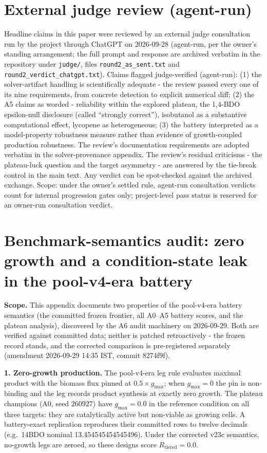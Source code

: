 \documentclass[12pt,a4paper]{article}
\begin{document}
\section{External judge review (agent-run)}
\begin{sloppypar}
Headline claims in this paper were reviewed by an external judge consultation run by the project through ChatGPT on 2026-09-28 (agent-run, per the owner's standing arrangement; the full prompt and response are archived verbatim in the repository under \texttt{judge/}, files \texttt{round2\_as\_sent.txt} and \texttt{round2\_verdict\_chatgpt.txt}). Claims flagged judge-verified (agent-run): (1) the solver-artifact handling is scientifically adequate - the review passed every one of its nine requirements, from concrete detection to explicit numerical diff; (2) the A5 claims as worded - reliability within the explored plateau, the 1,4-BDO epsilon-null disclosure (called ``strongly correct''), isobutanol as a substantive computational effect, lycopene as heterogeneous; (3) the battery interpreted as a model-property robustness measure rather than evidence of growth-coupled production robustness. The review's documentation requirements are adopted verbatim in the solver-provenance appendix. The review's residual criticisms - the plateau-luck question and the target asymmetry - are answered by the tie-break control in the main text. Any verdict can be spot-checked against the archived exchange. Scope: under the owner's settled rule, agent-run consultation verdicts count for internal progression gates only; project-level pass status is reserved for an owner-run consultation verdict.
\end{sloppypar}
\section{Benchmark-semantics audit: zero growth and a condition-state leak in the pool-v4-era battery}
\label{app:semantics}

\textbf{Scope.} This appendix documents two properties of the pool-v4-era battery semantics (the committed frozen frontier, all A0--A5 battery scores, and the plateau analysis), discovered by the A6 audit machinery on 2026-09-29. Both are verified against committed data; neither is patched retroactively - the frozen record stands, and the corrected comparison is pre-registered separately (amendment 2026-09-29 14:35 IST, commit 8274f9f).

\textbf{1. Zero-growth production.} The pool-v4-era leg rule evaluates maximal product with the biomass flux pinned at $0.5 \times g_{\max}$; when $g_{\max} = 0$ the pin is non-binding and the leg records product synthesis at exactly zero growth. The plateau champions (A0, seed 260927) have $g_{\max} = 0.0$ in the reference condition on all three targets: they are catalytically active but non-viable as growing cells. A battery-exact replication reproduces their committed rows to twelve decimals (e.g.\ 14BDO nominal 13.454545454545496). Under the corrected v23c semantics, no-growth legs are zeroed, so these designs score $R_{\mathrm{tiered}} = 0.0$.
\end{document}
